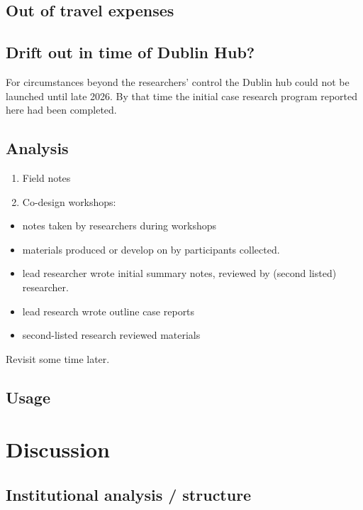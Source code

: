 \documentclass[preprint, 3p,
authoryear]{elsarticle} %
\providecommand{\tightlist}{%
  \setlength{\itemsep}{0pt}\setlength{\parskip}{0pt}}
\begin{document}
\subsection{Out of travel expenses}\label{out-of-travel-expenses}

\subsection{Drift out in time of Dublin
Hub?}\label{drift-out-in-time-of-dublin-hub}

For circumstances beyond the researchers' control the Dublin hub could
not be launched until late 2026. By that time the initial case research
program reported here had been completed.

\subsection{Analysis}\label{analysis}

\begin{enumerate}
\def\labelenumi{\arabic{enumi}.}
\tightlist
\item
  Field notes
\item
  Co-design workshops:
\end{enumerate}

\begin{itemize}
\tightlist
\item
  notes taken by researchers during workshops
\item
  materials produced or develop on by participants collected.
\item
  lead researcher wrote initial summary notes, reviewed by (second
  listed) researcher.
\item
  lead research wrote outline case reports
\item
  second-listed research reviewed materials
\end{itemize}

Revisit some time later.

\subsection{Usage}\label{usage}

\section{Discussion}\label{discussion}

\subsection{Institutional analysis /
structure}\label{institutional-analysis-structure}
\end{document}
